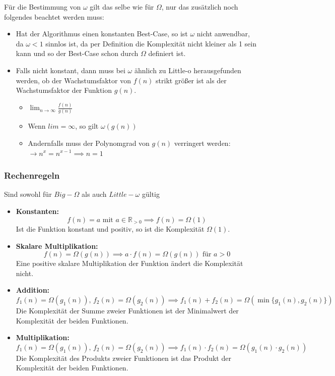 \documentclass[
../AuD-Zusammenfassung.tex,
]
{subfiles}
\begin{document}
Für die Bestimmung von $\omega$ gilt das selbe wie für $\Omega$, nur das zusätzlich noch folgendes beachtet werden muss: 
\begin{itemize}
    \item Hat der Algorithmus einen konstanten Best-Case, so ist $\omega$ nicht anwendbar, da $\omega < 1$ sinnlos ist, da per Definition die Komplexität nicht kleiner als 1 sein kann und so der Best-Case schon durch $\Omega$ definiert ist. 
    \item Falls nicht konstant, dann muss bei $\omega$ ähnlich zu Little-o herausgefunden werden, ob der Wachstumsfaktor von $f(n)$ strikt größer ist als der Wachstumsfaktor der Funktion $g(n)$.
    \begin{itemize}
        \item $\lim_{n \to \infty}\frac{f(n)}{g(n)}$
        \item Wenn $lim = \infty$, so gilt $\omega(g(n))$
        \item Andernfalls muss der Polynomgrad von $g(n)$ verringert werden:\\
        $\longrightarrow n^x = n^{x - 1} \implies n = 1$
    \end{itemize}
\end{itemize}

\subsubsection{Rechenregeln}
Sind sowohl für $Big-\Omega$ als auch $Little-\omega$ gültig

\begin{itemize}
    \item \textbf{Konstanten:} \\
    \[
    f(n) = a \text{ mit } a \in \mathbb{R}_{>0} \implies f(n) = \Omega(1)
    \]
    Ist die Funktion konstant und positiv, so ist die Komplexität \(\Omega(1)\).

    \item \textbf{Skalare Multiplikation:} \\
    \[
    f(n) = \Omega(g(n)) \implies a \cdot f(n) = \Omega(g(n)) \text{ für } a > 0
    \]
    Eine positive skalare Multiplikation der Funktion ändert die Komplexität nicht.

    \item \textbf{Addition:} \\
    \[
    f_1(n) = \Omega(g_1(n)), \, f_2(n) = \Omega(g_2(n)) \implies f_1(n) + f_2(n) = \Omega(\min\{g_1(n), g_2(n)\})
    \]
    Die Komplexität der Summe zweier Funktionen ist der Minimalwert der Komplexität der beiden Funktionen.

    \item \textbf{Multiplikation:} \\
    \[
    f_1(n) = \Omega(g_1(n)), \, f_2(n) = \Omega(g_2(n)) \implies f_1(n) \cdot f_2(n) = \Omega(g_1(n) \cdot g_2(n))
    \]
    Die Komplexität des Produkts zweier Funktionen ist das Produkt der Komplexität der beiden Funktionen.
\end{itemize}
\end{document}
